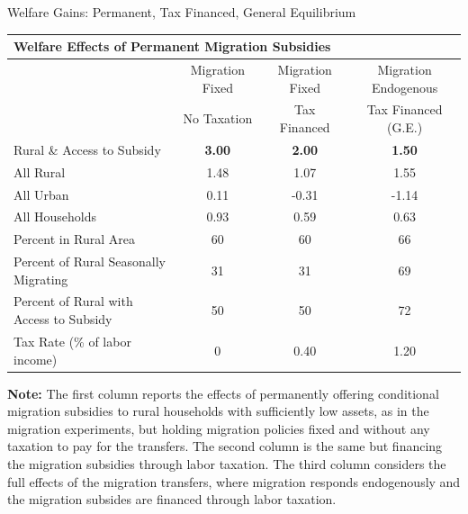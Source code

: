\documentclass[9pt,pdftex,aspectratio=1610]{beamer}
\theoremstyle{definition}
\begin{document}

\begin{frame}[t]{Welfare Gains: Permanent, Tax Financed, General Equilibrium}
\vspace{-0.25cm}
\begin{table}[!t]
\small
\setlength {\tabcolsep}{2.055mm}
\renewcommand{\arraystretch}{1.30}
\begin{center}
\begin{tabular}{l c c c}
\multicolumn{4}{l}{\textbf{Welfare Effects of Permanent Migration Subsidies}} \\
\hline
\hline
						& Migration Fixed & Migration Fixed & Migration Endogenous \\
						& No Taxation & Tax Financed & Tax Financed (G.E.) \\
						\cmidrule(lr){2-2} \cmidrule(lr){3-3}     \cmidrule(lr){4-4}
Rural \& Access to Subsidy      & \textbf{3.00}  			& \textbf{2.00} 			& \textbf{1.50}  \\
All Rural      &1.48  			& 1.07 			& 1.55  \\
All Urban     & 0.11 			& -0.31 			& -1.14  \\
All Households      & 0.93  			& 0.59 			& 0.63  \\
\hline
Percent in Rural Area				   & 60 			& 60				&  66 \\
Percent of Rural Seasonally Migrating		   & 31 			& 31				&  69 \\
Percent of Rural with Access to Subsidy		   & 50 			& 50				&  72 \\
Tax Rate (\% of labor income)		  		 & 0 			& 0.40				&  1.20 \\
\hline
\end{tabular}
\parbox[t]{5.25in}{%
{\footnotesize  \vspace{0.1cm} \textbf{Note:} The first column reports the effects of permanently offering conditional migration subsidies to rural households with sufficiently low assets, as in the migration experiments, but holding migration policies fixed and without any taxation to pay for the transfers. The second column is the same but financing the migration subsidies through labor taxation. The third column considers the full effects of the migration transfers, where migration responds endogenously and the migration subsides are financed through labor taxation.}
}
\end{center}
\end{table}
\end{frame}
\end{document}
